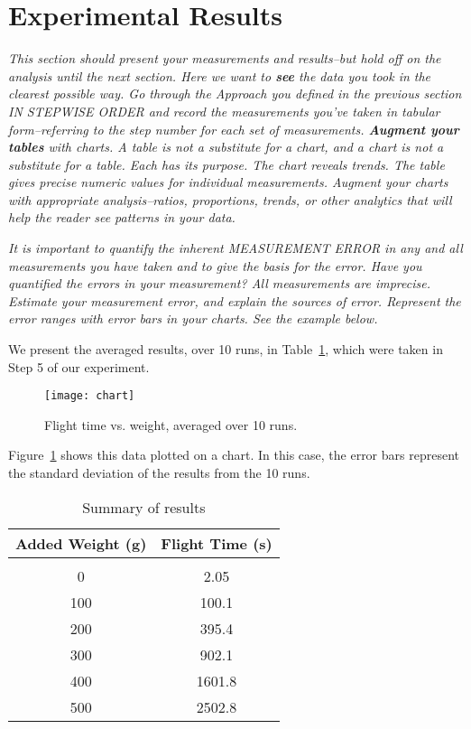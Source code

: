 \section{Experimental Results}

\emph{This section should present your measurements and results--but hold off on the analysis until the next section.  Here we want to \textbf{see} the data you took in the clearest possible way. Go through the Approach you defined in the previous section IN STEPWISE ORDER and record the measurements you've taken in tabular form--referring to the step number for each set of measurements. \textbf{Augment your tables} with charts.  A table is not a substitute for a chart, and a chart is not a substitute for a table.  Each has its purpose.  The chart reveals trends.  The table gives precise numeric values for individual measurements.  Augment your charts with appropriate analysis--ratios, proportions, trends, or other analytics that will help the reader see patterns in your data.}

\emph{It is important to quantify the inherent MEASUREMENT ERROR in any and all measurements you have taken and to give the basis for the error. Have you quantified the errors in your measurement?  All measurements are imprecise.  Estimate your measurement error, and explain the sources of error.  Represent the error ranges with error bars in your charts.  See the example below.}

We present the averaged results, over 10 runs, in Table~\ref{table:summarytable}, which were taken in Step 5 of our experiment.

\begin{figure}[h]
\centering
\texttt{[image: chart]}
\caption{Flight time vs. weight, averaged over 10 runs.}
\label{fig:chart}
\end{figure}

Figure~\ref{fig:chart} shows this data plotted on a chart. In this case, the error bars represent the standard deviation of the results from the 10 runs.

\begin{table}[t]
\caption{Summary of results}
\label{table:summarytable}
\begin{center}
\begin{tabular}{cc}
\bf Added Weight (g) & \bf Flight Time (s)
\\ \hline \\
0 & 2.05  \\
100 &100.1 \\
200 &395.4 \\
300 & 902.1 \\
400 & 1601.8 \\
500 & 2502.8 \\

\end{tabular}
\end{center}
\end{table}

